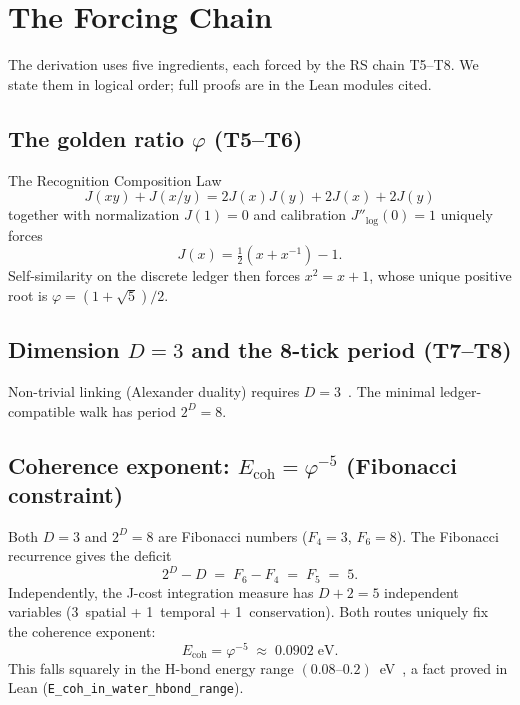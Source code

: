 \documentclass[aps,prl,twocolumn,superscriptaddress,showpacs,floatfix]{revtex4-2}
\newcommand{\Ecoh}{E_{\mathrm{coh}}}
\newcommand{\phig}{\varphi}
\begin{document}
\section{The Forcing Chain}

The derivation uses five ingredients, each forced by the RS chain T5--T8.
We state them in logical order; full proofs are in the Lean modules cited.

\subsection{The golden ratio \texorpdfstring{$\phig$}{phi} (T5--T6)}

The Recognition Composition Law
\begin{equation}
  J(xy) + J(x/y) = 2J(x)J(y) + 2J(x) + 2J(y)
\end{equation}
together with normalization $J(1) = 0$ and calibration $J''_{\log}(0) = 1$ uniquely forces~\cite{Washburn2025}
\begin{equation}
  J(x) = \tfrac{1}{2}(x + x^{-1}) - 1.
\end{equation}
Self-similarity on the discrete ledger then forces $x^2 = x + 1$, whose unique positive root is $\phig = (1+\sqrt5)/2$.

\subsection{Dimension $D = 3$ and the 8-tick period (T7--T8)}

Non-trivial linking (Alexander duality) requires $D = 3$~\cite{WashburnD3}.
The minimal ledger-compatible walk has period $2^D = 8$.

\subsection{Coherence exponent: \texorpdfstring{$\Ecoh = \phig^{-5}$}{Ecoh = phi^-5} (Fibonacci constraint)}

Both $D = 3$ and $2^D = 8$ are Fibonacci numbers ($F_4 = 3$, $F_6 = 8$).
The Fibonacci recurrence gives the deficit
\begin{equation}
  2^D - D \;=\; F_6 - F_4 \;=\; F_5 \;=\; 5.
  \label{eq:fib-deficit}
\end{equation}
Independently, the J-cost integration measure has $D + 2 = 5$ independent variables (3~spatial + 1~temporal + 1~conservation).
Both routes uniquely fix the coherence exponent:
\begin{equation}
  \Ecoh = \phig^{-5} \;\approx\; 0.0902\;\text{eV}.
\end{equation}
This falls squarely in the H-bond energy range $(0.08\text{--}0.2)$~eV~\cite{Gaynor2024},
a fact proved in Lean (\texttt{E\_coh\_in\_water\_hbond\_range}).
\end{document}
